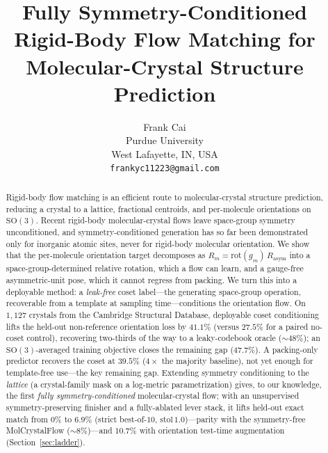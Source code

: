 \documentclass{article}
\title{Fully Symmetry-Conditioned Rigid-Body Flow Matching for
Molecular-Crystal Structure Prediction}
\author{%
  Frank Cai\\
  Purdue University\\
  West Lafayette, IN, USA\\
  \texttt{frankyc11223@gmail.com}\\
}
\begin{document}
\maketitle

\begin{abstract}
Rigid-body flow matching is an efficient route to molecular-crystal structure
prediction, reducing a crystal to a lattice, fractional centroids, and
per-molecule orientations on $\mathrm{SO}(3)$. Recent rigid-body
molecular-crystal flows leave space-group symmetry unconditioned, and
symmetry-conditioned generation has so far been demonstrated only for inorganic
atomic sites, never for rigid-body molecular orientation. We show that the
per-molecule orientation target decomposes as
$R_m=\mathrm{rot}(g_m)\,R_{\text{asym}}$ into a space-group-determined relative
rotation, which a flow can learn, and a gauge-free asymmetric-unit pose, which it
cannot regress from packing. We turn this into a deployable method: a
\emph{leak-free} coset label---the generating space-group operation, recoverable
from a template at sampling time---conditions the orientation flow. On $1{,}127$
crystals from the Cambridge Structural Database, deployable coset conditioning
lifts the held-out non-reference orientation loss by $41.1\%$ (versus $27.5\%$
for a paired no-coset control), recovering two-thirds of the way to a
leaky-codebook oracle ($\sim\!48\%$); an $\mathrm{SO}(3)$-averaged training
objective closes the remaining gap ($47.7\%$). A packing-only predictor recovers
the coset at $39.5\%$ ($4\times$ the majority baseline), not yet enough for
template-free use---the key remaining gap. Extending symmetry conditioning to the \emph{lattice} (a crystal-family mask
on a log-metric parametrization) gives, to our knowledge, the first \emph{fully
symmetry-conditioned} molecular-crystal flow; with an unsupervised
symmetry-preserving finisher and a fully-ablated lever stack, it lifts held-out
exact match from $0\%$ to $6.9\%$ (strict best-of-$10$,
$\text{stol}\,1.0$)---parity with the symmetry-free MolCrystalFlow ($\sim\!8\%$)---and
$10.7\%$ with orientation test-time augmentation (Section~\ref{sec:ladder}).
\end{abstract}

\end{document}
